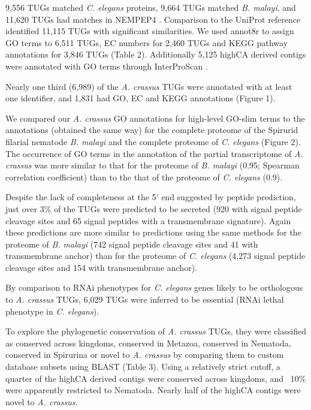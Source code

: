 \documentclass[10pt]{bmc_article}
\newenvironment{bmcformat}{\begin{raggedright}\baselineskip20pt\sloppy\setboolean{publ}{false}}{\end{raggedright}\baselineskip20pt\sloppy}
\begin{document}
\begin{bmcformat}
9,556
TUGs matched \textit{C. elegans} proteins,
9,664
TUGs matched \textit{B. malayi}, and
11,620
TUGs had matches in NEMPEP4 \cite{parkinson_nembase:resource_2004,
  pmid21550347}. Comparison to the UniProt reference identified
11,115
TUGs with significant similarities. We used annot8r
\cite{schmid_annot8r:_2008} to assign GO terms to 6,511
TUGs, EC numbers for 2,460 TUGs and KEGG pathway annotations
for 3,846 TUGs (Table 2). Additionally 5,125
highCA derived contigs were annotated with GO terms through
InterProScan \cite{pmid11590104}. 

Nearly one third (6,989) of the
\textit{A. crassus} TUGs were annotated with at least one identifier,
and 1,831 had GO, EC and KEGG annotations (Figure
1).

We compared our \textit{A. crassus} GO annotations for high-level
GO-slim terms to the annotations (obtained the same way) for the
complete proteome of the Spirurid filarial nematode \textit{B. malayi}
and the complete proteome of \textit{C. elegans} (Figure 2). The
occurrence of GO terms in the annotation of the partial transcriptome
of \textit{A. crassus} was more similar to that for the proteome of
\textit{B. malayi} (0.95; Spearman correlation coefficient) than to
the that of the proteome of \textit{C. elegans} (0.9).

Despite the lack of completeness at the 5' end suggested by peptide
prediction, just over 3\% of the TUGs were predicted to be secreted
(920 with signal peptide cleavage sites and
65 signal peptides with a transmembrane
signature). Again these predictions are more similar to predictions
using the same methods for the proteome of \textit{B. malayi} (742
signal peptide cleavage sites and 41 with transmembrane anchor) than
for the proteome of \textit{C. elegans} (4,273 signal peptide cleavage
sites and 154 with transmembrane anchor).

By comparison to RNAi phenotypes for \textit{C. elegans} genes
\cite{pmid12529635, pmid19910365} likely to be orthologous to
\textit{A. crassus} TUGs, 6,029 TUGs were inferred to be essential
(RNAi lethal phenotype in \textit{C. elegans}).

To explore the phylogenetic conservation of \textit{A. crassus} TUGs,
they were classified as conserved across kingdoms, conserved in
Metazoa, conserved in Nematoda, conserved in Spirurina or novel to
\textit{A. crassus} by comparing them to custom database subsets using
BLAST (Table 3). Using a relatively strict cutoff, a quarter of the
highCA derived contigs were conserved across kingdoms, and ~10\% were
apparently restricted to Nematoda. Nearly half of the highCA contigs
were novel to \textit{A. crassus}.


\end{bmcformat}
\end{document}
